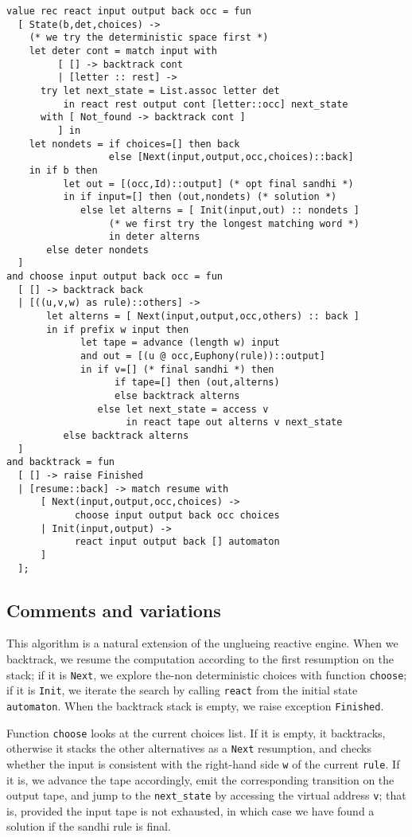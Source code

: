 \begin{verbatim}
value rec react input output back occ = fun
  [ State(b,det,choices) -> 
    (* we try the deterministic space first *)
    let deter cont = match input with
         [ [] -> backtrack cont
         | [letter :: rest] -> 
      try let next_state = List.assoc letter det
          in react rest output cont [letter::occ] next_state 
      with [ Not_found -> backtrack cont ]
         ] in
    let nondets = if choices=[] then back
                  else [Next(input,output,occ,choices)::back] 
    in if b then 
          let out = [(occ,Id)::output] (* opt final sandhi *)
          in if input=[] then (out,nondets) (* solution *)
             else let alterns = [ Init(input,out) :: nondets ]
                  (* we first try the longest matching word *)
                  in deter alterns
       else deter nondets
  ]
and choose input output back occ = fun
  [ [] -> backtrack back 
  | [((u,v,w) as rule)::others] -> 
       let alterns = [ Next(input,output,occ,others) :: back ]
       in if prefix w input then 
             let tape = advance (length w) input 
             and out = [(u @ occ,Euphony(rule))::output]
             in if v=[] (* final sandhi *) then
                   if tape=[] then (out,alterns) 
                   else backtrack alterns
                else let next_state = access v 
                     in react tape out alterns v next_state 
          else backtrack alterns
  ]
and backtrack = fun
  [ [] -> raise Finished
  | [resume::back] -> match resume with
      [ Next(input,output,occ,choices) -> 
            choose input output back occ choices 
      | Init(input,output) -> 
            react input output back [] automaton
      ] 
  ];
\end{verbatim}

\subsection{Comments and variations}
\label{variants}

This algorithm is a natural extension of the unglueing reactive engine. 
When we backtrack, we resume
the computation according to the first resumption on the stack; if it is
\verb:Next:, we explore the-non deterministic choices with function
\verb:choose:; if it is \verb:Init:, we 
iterate the search by calling \verb:react: from the initial state 
\verb:automaton:.
When the backtrack stack is empty, we raise exception \verb:Finished:.

Function \verb:choose: looks at the current choices list. If it is
empty, it backtracks, otherwise it stacks the other alternatives as a 
\verb:Next: resumption, and checks whether the input is consistent with
the right-hand side \verb:w: of the current \verb:rule:. If it is, we
advance the tape accordingly, emit the corresponding transition on the
output tape, and jump to the \verb:next_state: by accessing the virtual
address \verb:v:; that is, provided the input tape is not exhausted,
in which case we have found a solution if the sandhi rule is final. 

